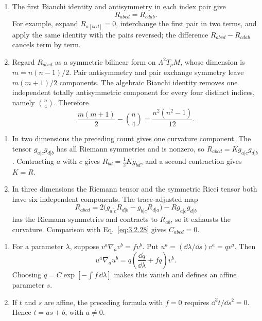 \begin{enumerate}[leftmargin=2.8em,itemsep=1.2em]
\begin{enumerate}[label=\alph*),leftmargin=2em]
\item The first Bianchi identity and antisymmetry in each index pair give
\[
 R_{abcd}=R_{cdab}.
\]
For example, expand \(R_{a[bcd]}=0\), interchange the first pair in two
terms, and apply the same identity with the pairs reversed; the difference
\(R_{abcd}-R_{cdab}\) cancels term by term.

\item Regard \(R_{abcd}\) as a symmetric bilinear form on
\(\Lambda^2T_pM\), whose dimension is
\(m=n(n-1)/2\).  Pair antisymmetry and pair exchange symmetry leave
\(m(m+1)/2\) components.  The algebraic Bianchi identity removes one
independent totally antisymmetric component for every four distinct indices,
namely \(\binom n4\).  Therefore
\[
 \frac{m(m+1)}2-\binom n4
 =\frac{n^2(n^2-1)}{12}.
\]
\end{enumerate}

\begin{enumerate}[label=\alph*),leftmargin=2em]
\item In two dimensions the preceding count gives one curvature component.
The tensor \(g_{a[c}g_{d]b}\) has all Riemann symmetries and is nonzero, so
\(R_{abcd}=K g_{a[c}g_{d]b}\).  Contracting \(a\) with \(c\) gives
\(R_{bd}=\tfrac12K g_{bd}\), and a second contraction gives \(K=R\).

\item In three dimensions the Riemann tensor and the symmetric Ricci tensor
both have six independent components.  The trace-adjusted map
\[
 R_{abcd}=2\bigl(g_{a[c}R_{d]b}-g_{b[c}R_{d]a}\bigr)
 -R g_{a[c}g_{d]b}
\]
has the Riemann symmetries and contracts to \(R_{ab}\), so it exhausts the
curvature.  Comparison with Eq.~\eqref{eq:3.2.28} gives \(C_{abcd}=0\).
\end{enumerate}

\begin{enumerate}[label=\alph*),leftmargin=2em]
\item For a parameter \(\lambda\), suppose
\(v^a\nabla_av^b=fv^b\).  Put \(u^a=(\dd\lambda/\dd s)v^a=qv^a\).
Then
\[
 u^a\nabla_au^b=q\left(\frac{\dd q}{\dd\lambda}+fq\right)v^b.
\]
Choosing
\(q=C\exp[-\int f\,\dd\lambda]\) makes this vanish and defines an affine
parameter \(s\).

\item If \(t\) and \(s\) are affine, the preceding formula with \(f=0\)
requires \(\dd^2t/\dd s^2=0\).  Hence \(t=as+b\), with \(a\ne0\).
\end{enumerate}


\end{enumerate}
